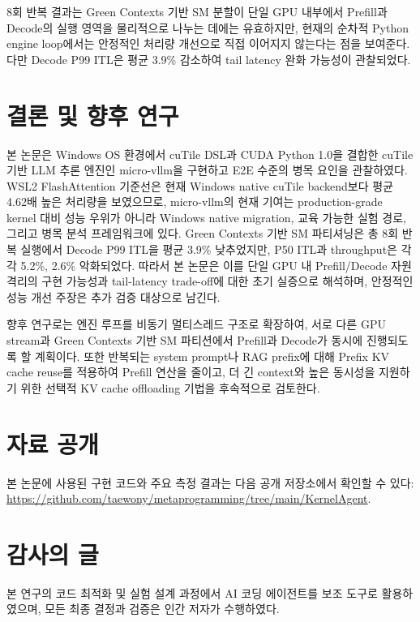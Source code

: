 \documentclass{kcc}            %
\begin{document}
8회 반복 결과는 Green Contexts 기반 SM 분할이 단일 GPU 내부에서 Prefill과
Decode의 실행 영역을 물리적으로 나누는 데에는 유효하지만, 현재의 순차적
Python engine loop에서는 안정적인 처리량 개선으로 직접 이어지지 않는다는
점을 보여준다. 다만 Decode P99 ITL은 평균 3.9\% 감소하여 tail latency 완화
가능성이 관찰되었다.

\section{결론 및 향후 연구}
본 논문은 Windows OS 환경에서 cuTile DSL과 CUDA Python 1.0을 결합한
cuTile 기반 LLM 추론 엔진인 micro-vllm을 구현하고 E2E 수준의 병목 요인을
관찰하였다. WSL2 FlashAttention 기준선은 현재 Windows native cuTile
backend보다 평균 4.62배 높은 처리량을 보였으므로, micro-vllm의 현재 기여는
production-grade kernel 대비 성능 우위가 아니라 Windows native migration,
교육 가능한 실험 경로, 그리고 병목 분석 프레임워크에 있다. Green Contexts
기반 SM 파티셔닝은 총 8회 반복 실행에서 Decode P99 ITL을 평균 3.9\%
낮추었지만, P50 ITL과 throughput은 각각 5.2\%, 2.6\% 악화되었다. 따라서 본
논문은 이를 단일 GPU 내 Prefill/Decode 자원 격리의 구현 가능성과
tail-latency trade-off에 대한 초기 실증으로 해석하며, 안정적인 성능 개선
주장은 추가 검증 대상으로 남긴다.

향후 연구로는 엔진 루프를 비동기 멀티스레드 구조로 확장하여, 서로 다른 GPU
stream과 Green Contexts 기반 SM 파티션에서 Prefill과 Decode가 동시에
진행되도록 할 계획이다. 또한 반복되는 system prompt나 RAG prefix에 대해
Prefix KV cache reuse를 적용하여 Prefill 연산을 줄이고, 더 긴 context와
높은 동시성을 지원하기 위한 선택적 KV cache offloading 기법을 후속적으로
검토한다.

\section*{자료 공개}
본 논문에 사용된 구현 코드와 주요 측정 결과는 다음 공개 저장소에서 확인할
수 있다: \url{https://github.com/taewony/metaprogramming/tree/main/KernelAgent}.

\section*{감사의 글}
본 연구의 코드 최적화 및 실험 설계 과정에서 AI 코딩 에이전트를 보조 도구로
활용하였으며, 모든 최종 결정과 검증은 인간 저자가 수행하였다.
\end{document}
